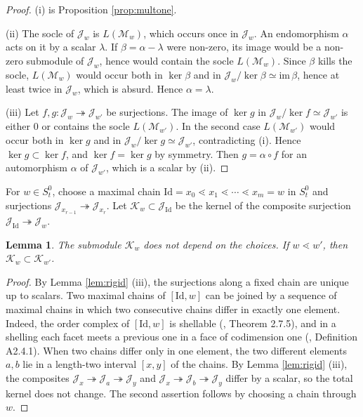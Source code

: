 \documentclass[a4paper,12pt,leqno]{amsart}
\newcommand{\caJ}{\mathcal{J}}
\newcommand{\caK}{\mathcal{K}}
\newcommand{\caM}{\mathcal{M}}
\theoremstyle{plain}
\newtheorem{lemma}[thm]{Lemma}
\theoremstyle{definition}
\theoremstyle{definition}
\newcommand{\Id}{\mathrm{Id}}
\begin{document}
\begin{proof}
(i) is Proposition \ref{prop:multone}.

(ii) The socle of $\caJ_w$ is $L(\caM_w)$, which occurs once in $\caJ_w$. An endomorphism $\alpha$ acts
 on it by a scalar $\lambda$. If $\beta=\alpha-\lambda$ were non-zero, its image would be a
 non-zero submodule of $\caJ_w$, hence would contain the socle $L(\caM_w)$. Since $\beta$ kills the
 socle, $L(\caM_w)$ would occur both in $\ker\beta$ and in
 $\caJ_w/\ker\beta\simeq\mathrm{im}\,\beta$, hence at least twice in $\caJ_w$, which is absurd.
 Hence $\alpha=\lambda$.

(iii) Let $f,g:\caJ_w\twoheadrightarrow\caJ_{w'}$ be surjections. The image of $\ker g$ in
$\caJ_w/\ker f\simeq\caJ_{w'}$
 is either $0$ or contains the socle $L(\caM_{w'})$. In the second case $L(\caM_{w'})$ would occur both in
 $\ker g$ and in $\caJ_w/\ker g\simeq\caJ_{w'}$, contradicting (i). Hence $\ker g\subset\ker f$,
 and $\ker f=\ker g$
 by symmetry. Then $g=\alpha\circ f$ for an automorphism $\alpha$ of $\caJ_{w'}$, which is a scalar by (ii).
\end{proof}

For $w\in S_t^0$, choose a maximal chain $\Id=x_0\lessdot x_1\lessdot\cdots\lessdot x_m=w$ in $S_t^0$
and surjections $\caJ_{x_{r-1}}\twoheadrightarrow\caJ_{x_r}$. Let $\caK_w\subset\caJ_{\Id}$ be the kernel
 of the composite surjection $\caJ_{\Id}\twoheadrightarrow\caJ_w$.

\begin{lemma}\label{lem:kernel} The submodule $\caK_w$ does not depend on the choices. If $w\lessdot w'$,
 then $\caK_w\subset\caK_{w'}$.
\end{lemma}

\begin{proof}
By Lemma \ref{lem:rigid} (iii), the surjections along a fixed chain are unique up to scalars.
Two maximal chains of $[\Id,w]$ can be joined by a sequence of maximal chains in which two consecutive
 chains differ in exactly one element. Indeed, the order complex of $[\Id,w]$ is shellable
 (\cite{BB05}, Theorem 2.7.5),
 and in a shelling each facet meets a previous one in a face of codimension one (\cite{BB05},
 Definition A2.4.1).
 When two chains differ only in one element, the two different elements $a,b$ lie in a length-two
 interval $[x,y]$ of the chains.
  By Lemma \ref{lem:rigid} (iii), the composites
  $\caJ_x\twoheadrightarrow\caJ_a\twoheadrightarrow\caJ_y$ and
  $\caJ_x\twoheadrightarrow\caJ_b\twoheadrightarrow\caJ_y$ differ by a scalar, so the total kernel
  does not change.
  The second assertion follows by choosing a chain through $w$.
\end{proof}
\end{document}
